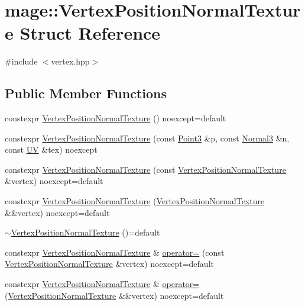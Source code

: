 \hypertarget{structmage_1_1_vertex_position_normal_texture}{}\section{mage\+:\+:Vertex\+Position\+Normal\+Texture Struct Reference}
\label{structmage_1_1_vertex_position_normal_texture}


{\ttfamily \#include $<$vertex.\+hpp$>$}

\subsection*{Public Member Functions}
\begin{DoxyCompactItemize}
\item 
constexpr \hyperlink{structmage_1_1_vertex_position_normal_texture_a68130a9df83c3663c02d12ac96487d55}{Vertex\+Position\+Normal\+Texture} () noexcept=default
\item 
constexpr \hyperlink{structmage_1_1_vertex_position_normal_texture_a40cc5e13738419d90063ef04646dc872}{Vertex\+Position\+Normal\+Texture} (const \hyperlink{structmage_1_1_point3}{Point3} \&p, const \hyperlink{structmage_1_1_normal3}{Normal3} \&n, const \hyperlink{structmage_1_1_u_v}{UV} \&tex) noexcept
\item 
constexpr \hyperlink{structmage_1_1_vertex_position_normal_texture_a278dd293e4609575268c4d8ec6052ff0}{Vertex\+Position\+Normal\+Texture} (const \hyperlink{structmage_1_1_vertex_position_normal_texture}{Vertex\+Position\+Normal\+Texture} \&vertex) noexcept=default
\item 
constexpr \hyperlink{structmage_1_1_vertex_position_normal_texture_abbf8e43a05bcf93dba75573ec43e1a88}{Vertex\+Position\+Normal\+Texture} (\hyperlink{structmage_1_1_vertex_position_normal_texture}{Vertex\+Position\+Normal\+Texture} \&\&vertex) noexcept=default
\item 
\hyperlink{structmage_1_1_vertex_position_normal_texture_a1dbfd9a6f88f075b59e56c353986b189}{$\sim$\+Vertex\+Position\+Normal\+Texture} ()=default
\item 
constexpr \hyperlink{structmage_1_1_vertex_position_normal_texture}{Vertex\+Position\+Normal\+Texture} \& \hyperlink{structmage_1_1_vertex_position_normal_texture_a9bd46fd18856265e02f5332d618f3a23}{operator=} (const \hyperlink{structmage_1_1_vertex_position_normal_texture}{Vertex\+Position\+Normal\+Texture} \&vertex) noexcept=default
\item 
constexpr \hyperlink{structmage_1_1_vertex_position_normal_texture}{Vertex\+Position\+Normal\+Texture} \& \hyperlink{structmage_1_1_vertex_position_normal_texture_a2072550a0506fc6b976487d410df686e}{operator=} (\hyperlink{structmage_1_1_vertex_position_normal_texture}{Vertex\+Position\+Normal\+Texture} \&\&vertex) noexcept=default
\end{DoxyCompactItemize}

